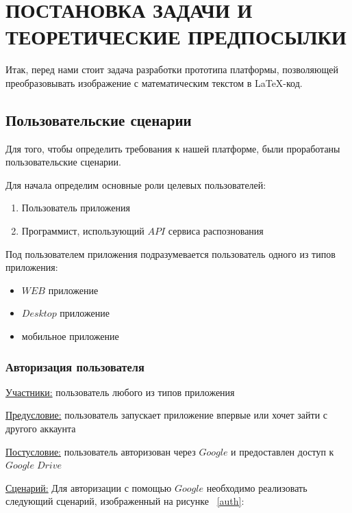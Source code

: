 \section{ПОСТАНОВКА ЗАДАЧИ И ТЕОРЕТИЧЕСКИЕ ПРЕДПОСЫЛКИ}

Итак, перед нами стоит задача разработки прототипа платформы, позволяющей преобразовывать изображение с математическим текстом в \LaTeX-код.

\subsection{Пользовательские сценарии}
Для того, чтобы определить требования к нашей платформе, были проработаны пользовательские сценарии.

Для начала определим основные роли целевых пользователей:
\begin{enumerate}
    \item Пользователь приложения
    \item Программист, использующий $API$ сервиса распознования
\end{enumerate}
Под пользователем приложения подразумевается пользователь одного из типов приложения:
\begin{itemize}
    \item $WEB$ приложение
    \item $Desktop$ приложение
    \item мобильное приложение
\end{itemize}

\subsubsection{Авторизация пользователя}
\underline{Участники:} пользователь любого из типов приложения

\underline{Предусловие:} пользователь запускает приложение впервые или хочет зайти с другого аккаунта

\underline{Постусловие:} пользователь авторизован через $Google$ и предоставлен доступ к $Google\;Drive$

\underline{Сценарий:}
Для авторизации с помощью $Google$ необходимо реализовать следующий сценарий, изображенный на рисунке ~\ref{auth}:

